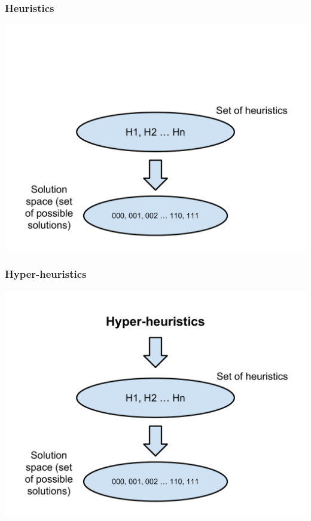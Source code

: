 \documentclass{beamer}
\begin{document}
\begin{frame}
	\frametitle{Heuristics}
	\includegraphics[height=.8\textheight]{Illustrations/heuristic_1.PDF}
	\\
\end{frame}

\begin{frame}
	\frametitle{Hyper-heuristics}
	\includegraphics[height=.8\textheight]{Illustrations/heuristic_2.PDF}
	\\
\end{frame}
\end{document}
